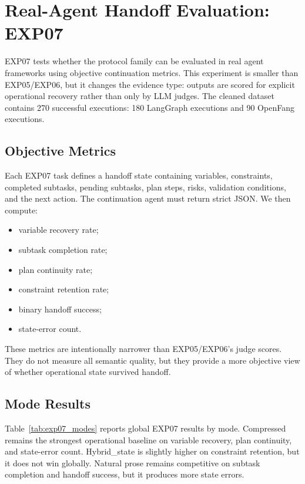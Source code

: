 \documentclass[11pt]{article}
\begin{document}
\section{Real-Agent Handoff Evaluation: EXP07}
\label{sec:exp07}

EXP07 tests whether the protocol family can be evaluated in real agent frameworks using objective continuation metrics. This experiment is smaller than EXP05/EXP06, but it changes the evidence type: outputs are scored for explicit operational recovery rather than only by LLM judges. The cleaned dataset contains 270 successful executions: 180 LangGraph executions and 90 OpenFang executions.

\subsection{Objective Metrics}
Each EXP07 task defines a handoff state containing variables, constraints, completed subtasks, pending subtasks, plan steps, risks, validation conditions, and the next action. The continuation agent must return strict JSON. We then compute:

\begin{itemize}
\item variable recovery rate;
\item subtask completion rate;
\item plan continuity rate;
\item constraint retention rate;
\item binary handoff success;
\item state-error count.
\end{itemize}

These metrics are intentionally narrower than EXP05/EXP06's judge scores. They do not measure all semantic quality, but they provide a more objective view of whether operational state survived handoff.

\subsection{Mode Results}
Table~\ref{tab:exp07_modes} reports global EXP07 results by mode. Compressed remains the strongest operational baseline on variable recovery, plan continuity, and state-error count. Hybrid\_state is slightly higher on constraint retention, but it does not win globally. Natural prose remains competitive on subtask completion and handoff success, but it produces more state errors.
\end{document}
